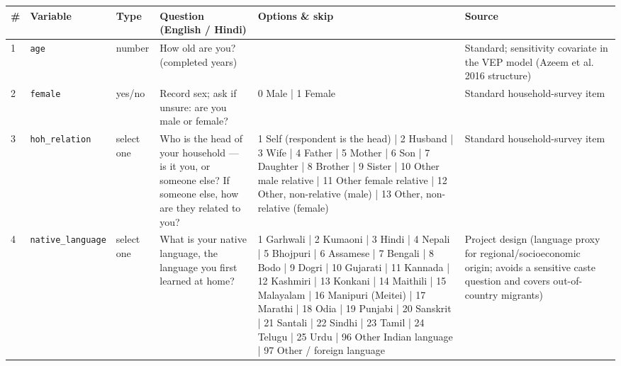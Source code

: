 \documentclass[9pt,a4paper,landscape]{article}
\begin{document}
\begin{longtable}{@{}p{0.5cm}p{3.3cm}p{1.7cm}p{7.3cm}p{5.6cm}p{5.4cm}@{}}
\toprule \footnotesize\textbf{\#} & \footnotesize\textbf{Variable} & \footnotesize\textbf{Type} & \footnotesize\textbf{Question (English / Hindi)} & \footnotesize\textbf{Options {\&} skip} & \footnotesize\textbf{Source}\\ \midrule
\endhead
\footnotesize 1 & \footnotesize\texttt{age} & \scriptsize number & \footnotesize How old are you? (completed years)\par\vspace{1pt}{\footnotesize\color{hdr}{\hifont आपकी उम्र कितनी है? (पूरे साल)}} & \scriptsize  & \scriptsize Standard; sensitivity covariate in the VEP model (Azeem et al. 2016 structure)\\
\footnotesize 2 & \footnotesize\texttt{female} & \scriptsize yes/no & \footnotesize Record sex; ask if unsure: are you male or female?\par\vspace{1pt}{\footnotesize\color{hdr}{\hifont आप पुरुष हैं या महिला?}} & \scriptsize 0 Male | 1 Female & \scriptsize Standard household-survey item\\
\footnotesize 3 & \footnotesize\texttt{hoh\_relation} & \scriptsize select one & \footnotesize Who is the head of your household — is it you, or someone else? If someone else, how are they related to you?\par\vspace{1pt}{\footnotesize\color{hdr}{\hifont आपके घर का मुखिया कौन है — आप खुद, या कोई और? अगर कोई और है, तो वे आपके क्या लगते हैं?}} & \scriptsize 1 Self (respondent is the head) | 2 Husband | 3 Wife | 4 Father | 5 Mother | 6 Son | 7 Daughter | 8 Brother | 9 Sister | 10 Other male relative | 11 Other female relative | 12 Other, non-relative (male) | 13 Other, non-relative (female) & \scriptsize Standard household-survey item\\
\footnotesize 4 & \footnotesize\texttt{native\_language} & \scriptsize select one & \footnotesize What is your native language, the language you first learned at home?\par\vspace{1pt}{\footnotesize\color{hdr}{\hifont आपकी मातृभाषा कौन सी है — वह भाषा जो आपने घर में सबसे पहले सीखी?}} & \scriptsize 1 Garhwali | 2 Kumaoni | 3 Hindi | 4 Nepali | 5 Bhojpuri | 6 Assamese | 7 Bengali | 8 Bodo | 9 Dogri | 10 Gujarati | 11 Kannada | 12 Kashmiri | 13 Konkani | 14 Maithili | 15 Malayalam | 16 Manipuri (Meitei) | 17 Marathi | 18 Odia | 19 Punjabi | 20 Sanskrit | 21 Santali | 22 Sindhi | 23 Tamil | 24 Telugu | 25 Urdu | 96 Other Indian language | 97 Other / foreign language & \scriptsize Project design (language proxy for regional/socioeconomic origin; avoids a sensitive caste question and covers out-of-country migrants)\\

\end{longtable}
\end{document}
